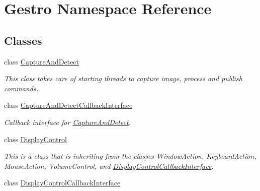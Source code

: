 \hypertarget{namespace_gestro}{}\section{Gestro Namespace Reference}
\label{namespace_gestro}
\subsection*{Classes}
\begin{DoxyCompactItemize}
\item 
class \hyperlink{class_gestro_1_1_capture_and_detect}{Capture\+And\+Detect}
\begin{DoxyCompactList}\small\item\em This class takes care of starting threads to capture image, process and publish commands. \end{DoxyCompactList}\item 
class \hyperlink{class_gestro_1_1_capture_and_detect_callback_interface}{Capture\+And\+Detect\+Callback\+Interface}
\begin{DoxyCompactList}\small\item\em Callback interface for \hyperlink{class_gestro_1_1_capture_and_detect}{Capture\+And\+Detect}. \end{DoxyCompactList}\item 
class \hyperlink{class_gestro_1_1_display_control}{Display\+Control}
\begin{DoxyCompactList}\small\item\em This is a class that is inheriting from the classes Window\+Action, Keyboard\+Action, Mouse\+Action, Volume\+Control, and \hyperlink{class_gestro_1_1_display_control_callback_interface}{Display\+Control\+Callback\+Interface}. \end{DoxyCompactList}\item 
class \hyperlink{class_gestro_1_1_display_control_callback_interface}{Display\+Control\+Callback\+Interface}
\end{DoxyCompactItemize}
